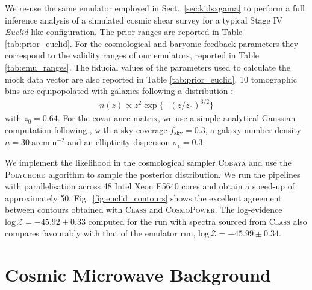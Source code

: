 \documentclass[fleqn,usenatbib]{mnras}
\begin{document}
We re-use the same emulator employed in Sect.~\ref{sec:kidsxgama} to perform a full inference analysis of a simulated cosmic shear survey for a typical Stage IV \textit{Euclid}-like configuration. The prior ranges are reported in Table \ref{tab:prior_euclid}. For the cosmological and baryonic feedback parameters they correspond to the validity ranges of our emulators, reported in Table \ref{tab:emu_ranges}. The fiducial values of the parameters used to calculate the mock data vector are also reported in Table \ref{tab:prior_euclid}. 10 tomographic bins are equipopolated with galaxies following a distribution \citep{Smail95, Joachimi10, Laureijs11}:
\begin{align}
    n(z) \propto z^2 \exp \{ -(z/z_0)^{3/2} \}
\end{align}
with $z_0=0.64$. For the covariance matrix, we use a simple analytical Gaussian computation following \citet{Tutusaus20}, with a sky coverage $f_{\mathrm{sky}}=0.3$, a galaxy number density $n = 30 \ \mathrm{arcmin}^{-2}$ and an ellipticity dispersion $\sigma_{\epsilon}=0.3$.

We implement the likelihood in the cosmological sampler \textsc{Cobaya} \citep{Torrado19, Torrado21} and use the \textsc{Polychord} algorithm \citep{Handley15a, Handley15b} to sample the posterior distribution. We run the pipelines with parallelisation across 48 Intel Xeon E5640 cores and obtain a speed-up of approximately 50. Fig.~\ref{fig:euclid_contours} shows the excellent agreement between contours obtained with \textsc{Class} and \textsc{CosmoPower}. The log-evidence $\mathrm{log} \, \mathcal{Z} = -45.92 \pm 0.33$ computed for the run with spectra sourced from \textsc{Class} also compares favourably with that of the emulator run, $\mathrm{log} \, \mathcal{Z} = -45.99 \pm 0.34$.

\section{Cosmic Microwave Background}
\label{sec:CMB}
%
\end{document}
